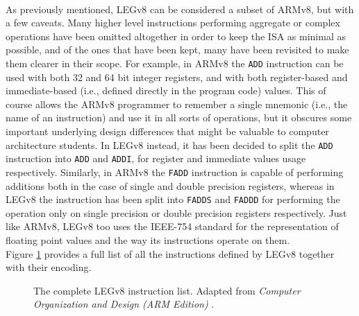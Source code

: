 \paragraph{}
As previously mentioned, LEGv8 can be considered a subset of ARMv8, but with a few caveats. Many higher level instructions performing aggregate or complex operations have been omitted altogether in order to keep the ISA as minimal as possible, and of the ones that have been kept, many have been revisited to make them clearer in their scope. For example, in ARMv8 the \verb|ADD| instruction can be used with both 32 and 64 bit integer registers, and with both register-based and immediate-based (i.e., defined directly in the program code) values. This of course allows the ARMv8 programmer to remember a single mnemonic (i.e., the name of an instruction) and use it in all sorts of operations, but it obscures some important underlying design differences that might be valuable to computer architecture students. In LEGv8 instead, it has been decided to split the \verb|ADD| instruction into \verb|ADD| and \verb|ADDI|, for register and immediate values usage respectively. Similarly, in ARMv8 the \verb|FADD| instruction is capable of performing additions both in the case of single and double precision registers, whereas in LEGv8 the instruction has been split into \verb|FADDS| and \verb|FADDD| for performing the operation only on single precision or double precision registers respectively. Just like ARMv8, LEGv8 too uses the IEEE-754 standard \cite{ieee754} for the representation of floating point values and the way its instructions operate on them.\\Figure \ref{fig:legv8instrlist} provides a full list of all the instructions defined by LEGv8 together with their encoding.
\begin{figure}[H]
	\centering
	\caption{The complete LEGv8 instruction list. Adapted from \emph{Computer Organization and Design (ARM Edition)} \cite{patterson2016computer}.}
    \label{fig:legv8instrlist}
\end{figure}
